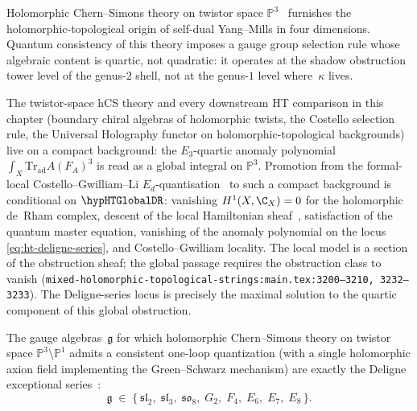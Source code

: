 Holomorphic Chern--Simons theory on twistor space
$\mathbb{P}^3$~\cite{Costello2111} furnishes the
holomorphic-topological origin of self-dual Yang--Mills in four
dimensions. Quantum consistency of this theory imposes a gauge
group selection rule whose algebraic content is quartic, not
quadratic: it operates at the shadow obstruction tower level of
the genus-$2$ shell, not at the genus-$1$ level where~$\kappa$
lives.

\begin{remark}
\label{rem:ht-global-de-rham-holomorphic-topological}
The twistor-space hCS theory and every downstream HT comparison in
this chapter (boundary chiral algebras of holomorphic twists, the
Costello selection rule, the Universal Holography functor on
holomorphic-topological backgrounds) live on a compact background:
the $E_3$-quartic anomaly polynomial $\int_X
\mathrm{Tr}_{\mathrm{ad}} A(F_A)^3$ is read as a global integral on
$\mathbb{P}^3$. Promotion from the formal-local Costello--Gwilliam--Li
$E_d$-quantisation~\cite{CG17} to such a compact background is
conditional on $\hypHTGlobalDR$: vanishing $H^1(X,\C_X) = 0$ for the
holomorphic de~Rham complex, descent of the local Hamiltonian
sheaf~\cite[\S4--5]{CG17}, satisfaction of the quantum master
equation, vanishing of the anomaly polynomial on the locus
\eqref{eq:ht-deligne-series}, and Costello--Gwilliam locality. The
local model is a section of the obstruction sheaf; the global
passage requires the obstruction class to vanish
(\texttt{mixed-holomorphic-topological-strings:main.tex:3200--3210,
3232--3233}). The Deligne-series locus is precisely the maximal
solution to the quartic component of this global obstruction.
\end{remark}

\begin{proposition}
\label{prop:ht-twistor-deligne}
The gauge algebras~$\mathfrak{g}$ for which holomorphic
Chern--Simons theory on twistor space
$\mathbb{P}^3 \setminus \mathbb{P}^1$ admits a consistent
one-loop quantization \textup{(}with a single holomorphic axion
field implementing the Green--Schwarz
mechanism\textup{)}
are exactly the Deligne exceptional
series~\cite{Deligne96, Cvitanovic08}:
\begin{equation}\label{eq:ht-deligne-series}
\mathfrak{g} \;\in\;
\bigl\{\,
 \mathfrak{sl}_2,\;
 \mathfrak{sl}_3,\;
 \mathfrak{so}_8,\;
 G_2,\;
 F_4,\;
 E_6,\;
 E_7,\;
 E_8
\,\bigr\}.
\end{equation}
\end{proposition}

